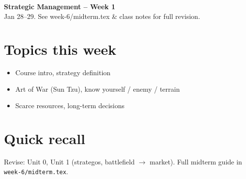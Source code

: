 \documentclass[10pt,a4paper]{article}
\begin{document}
\begin{center}
{\large\bfseries\color{eublue} Strategic Management -- Week 1}\\[0.2em]
\footnotesize Jan 28--29. See week-6/midterm.tex \& class notes for full revision.
\end{center}\vspace{0.5em}

\section*{\color{eublue}Topics this week}
\begin{itemize}
\item Course intro, strategy definition
\item Art of War (Sun Tzu), know yourself / enemy / terrain
\item Scarce resources, long-term decisions
\end{itemize}

\section*{Quick recall}
Revise: Unit 0, Unit 1 (strategos, battlefield $\to$ market). Full midterm guide in \texttt{week-6/midterm.tex}.
\end{document}
